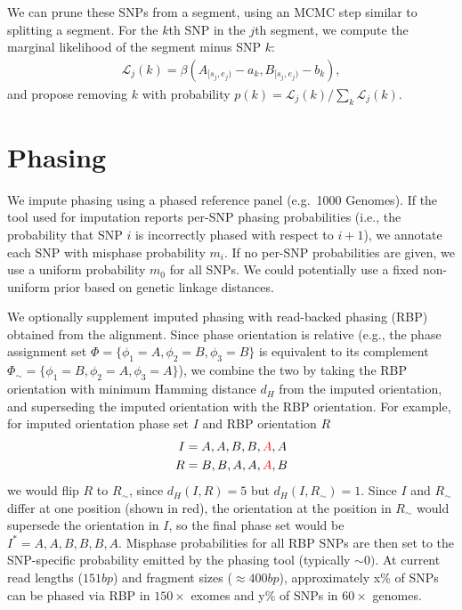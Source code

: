 \documentclass[10pt,letter]{article}
\numberwithin{equation}{section}
\begin{document}
We can prune these SNPs from a segment, using an MCMC step similar to splitting a segment. For the $k$th SNP in the $j$th segment, we compute the marginal likelihood of the segment minus SNP $k$:
\begin{align*}
\mathcal{L}_j(k) = \beta(A_{[s_j,e_j)} - a_k, B_{[s_j,e_j)} - b_k),
\end{align*}
and propose removing $k$ with probability $p(k)=\mathcal{L}_j(k)/\sum_k\mathcal{L}_j(k)$.

\section{Phasing}

We impute phasing using a phased reference panel (e.g.\ 1000 Genomes). If the tool used for imputation reports per-SNP phasing probabilities (i.e., the probability that SNP $i$ is incorrectly phased with respect to $i+1$), we annotate each SNP with misphase probability $m_i$. If no per-SNP probabilities are given, we use a uniform probability $m_0$ for all SNPs. We could potentially use a fixed non-uniform prior based on genetic linkage distances.

We optionally supplement imputed phasing with read-backed phasing (RBP) obtained from the alignment. Since phase orientation is relative (e.g., the phase assignment set $\Phi=\{\phi_1=A,\phi_2=B,\phi_3=B\}$ is equivalent to its complement $\Phi_\sim=\{\phi_1=B,\phi_2=A,\phi_3=A\}$), we combine the two by taking the RBP orientation with minimum Hamming distance $d_H$ from the imputed orientation, and superseding the imputed orientation with the RBP orientation. For example, for imputed orientation phase set $I$ and RBP orientation $R$
\begin{align*}
I &= {A,A,B,B,\textcolor{red}{A},A}\\
R &= {B,B,A,A,\textcolor{red}{A},B}
\end{align*}
we would flip $R$ to $R_{\sim}$, since $d_H(I,R)=5$ but $d_H(I,R_\sim)=1$. Since $I$ and $R_\sim$ differ at one position (shown in red), the orientation at the position in $R_\sim$ would supersede the orientation in $I$, so the final phase set would be $I^\ast=A,A,B,B,B,A$. Misphase probabilities for all RBP SNPs are then set to the SNP-specific probability emitted by the phasing tool (typically $\sim 0)$. At current read lengths ($151\unit{bp}$) and fragment sizes ($\approx 400\unit{bp}$), approximately x\% of SNPs can be phased via RBP in $150\times$ exomes and y\% of SNPs in $60\times$ genomes.
\end{document}
